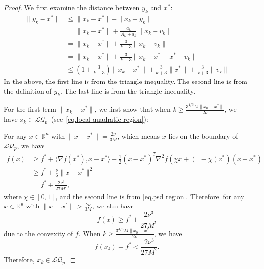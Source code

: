 \documentclass{mcom-l}
\numberwithin{equation}{section}
\begin{document}
\begin{proof}
    We first examine the distance between $y_k$ and $x^*$:
    \begin{equation*}
        \begin{aligned}
            \|y_k-x^*\| & \leq \|x_k-x^*\|+\|x_k-y_k\|                                                \\
                        & =\|x_k-x^*\|+\frac{a_k}{A_k+a_k}\|x_k-v_k\|                                 \\
                        & = \|x_k-x^*\|+\frac{3}{k+3}\|x_k-v_k\|                                      \\
                        & =\|x_k-x^*\|+\frac{3}{k+3}\|x_k-x^*+x^*-v_k\|                               \\
                        & \leq (1+\frac{3}{k+3})\|x_k-x^*\|+\frac{3}{k+3}\|x^*\|+\frac{3}{k+3}\|v_k\|
        \end{aligned}
    \end{equation*}
    In the above, the first line is from the triangle inequality. The second line is from the definition of $y_k$. The last line is from the triangle inequality.

    For the first term $\|x_k-x^*\|$, we first show that when $k\geq \frac{3^{4/3}M\|x_0-x^*\|}{2\nu}$, we have $x_k\in \mathcal{LQ}_p$~(see~\eqref{eq.local quadratic region}):

    For any $x\in\mathbb{R}^n$ with $\|x-x^*\| = \frac{2\nu}{3M}$, which means $x$ lies on the boundary of $\mathcal{LQ}_p$,
    we have
    \begin{equation*}
        \begin{aligned}
            f(x) & \geq f^* + \langle\nabla f(x^*),x-x^*\rangle +\frac{1}{2}(x-x^*)^T \nabla ^2 f(\chi x+(1-\chi)x^*)(x-x^*) \\
                 & \geq f^*+\frac{\nu}{6}\|x-x^*\|^2                                                                         \\
                 & =f^*+\frac{2\nu^3}{27M^2},
        \end{aligned}
    \end{equation*}
    where $\chi\in [0,1]$, and the second line is from \eqref{eq.psd region}. Therefore, for any $x\in\mathbb{R}^n$ with $\|x-x^*\| >\frac{2\nu}{3M}$, we also have
    \begin{equation*}
        f(x)\geq f^*+\frac{2\nu^3}{27M^2}
    \end{equation*}
    due to the convexity of $f$. When $k\geq \frac{3^{4/3}M\|x_0-x^*\|}{2\nu}$, we have
    \begin{equation*}
        f(x_k)-f^*< \frac{2\nu^3}{27M^2}.
    \end{equation*}
    Therefore, $x_k\in\mathcal{LQ}_p$.


\end{proof}
\end{document}
